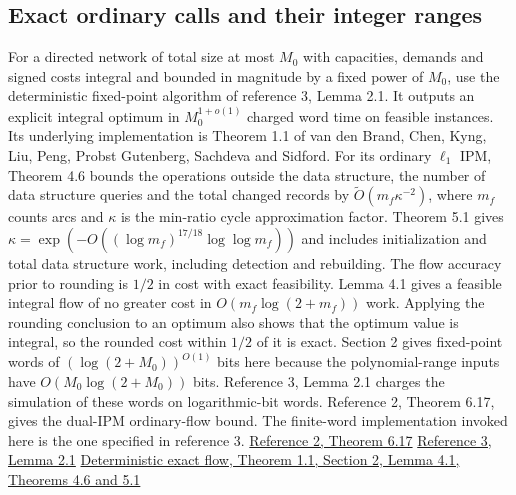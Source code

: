 \documentclass[11pt]{article}
\begin{document}
\hypertarget{exact-ordinary-calls-and-their-integer-ranges}{%
\subsection*{Exact ordinary calls and their integer ranges}\label{exact-ordinary-calls-and-their-integer-ranges}}

For a directed network of total size at most \(M_0\) with capacities, demands and signed costs integral and bounded in magnitude by a fixed power of \(M_0\), use the deterministic fixed-point algorithm of reference 3, Lemma 2.1. It outputs an explicit integral optimum in \(M_0^{1+o(1)}\) charged word time on feasible instances. Its underlying implementation is Theorem 1.1 of van den Brand, Chen, Kyng, Liu, Peng, Probst Gutenberg, Sachdeva and Sidford. For its ordinary \(\ell_1\) IPM, Theorem 4.6 bounds the operations outside the data structure, the number of data structure queries and the total changed records by \(\widetilde O(m_f\kappa^{-2})\), where \(m_f\) counts arcs and \(\kappa\) is the min-ratio cycle approximation factor. Theorem 5.1 gives \(\kappa=\exp(-O((\log m_f)^{17/18}\log\log m_f))\) and includes initialization and total data structure work, including detection and rebuilding. The flow accuracy prior to rounding is \(1/2\) in cost with exact feasibility. Lemma 4.1 gives a feasible integral flow of no greater cost in \(O(m_f\log(2+m_f))\) work. Applying the rounding conclusion to an optimum also shows that the optimum value is integral, so the rounded cost within \(1/2\) of it is exact. Section 2 gives fixed-point words of \((\log(2+M_0))^{O(1)}\) bits here because the polynomial-range inputs have \(O(M_0\log(2+M_0))\) bits. Reference 3, Lemma 2.1 charges the simulation of these words on logarithmic-bit words. Reference 2, Theorem 6.17, gives the dual-IPM ordinary-flow bound. The finite-word implementation invoked here is the one specified in reference 3. \href{https://arxiv.org/pdf/2407.10830v1}{Reference 2, Theorem 6.17} \href{https://github.com/openai/math/blob/main/preprints/Almost-Linear-Time-Maximum-Cardinality-Matching-in-Sparse-General-Graphs-September-24-2026/main.pdf}{Reference 3, Lemma 2.1} \href{https://arxiv.org/pdf/2309.16629}{Deterministic exact flow, Theorem 1.1, Section 2, Lemma 4.1, Theorems 4.6 and 5.1}
\end{document}
